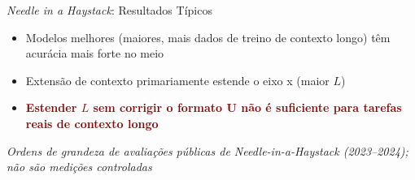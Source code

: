 \documentclass[aspectratio=169, xcolor=dvipsnames]{beamer}
\begin{document}
  \begin{frame}{\textit{Needle in a Haystack}: Resultados Típicos}
    \centering

    \flushleft
    \begin{itemize}
      \item Modelos melhores (maiores, mais dados de treino de contexto longo) têm acurácia mais forte no meio
      \item Extensão de contexto primariamente estende o eixo x (maior $L$)
      \item \textcolor{DarkRed}{\textbf{Estender $L$ sem corrigir o formato U não é suficiente para tarefas reais de contexto longo}}
    \end{itemize}

    {\scriptsize\textit{Ordens de grandeza de avaliações públicas de Needle-in-a-Haystack (2023--2024); não são medições controladas}}
  \end{frame}
\end{document}
